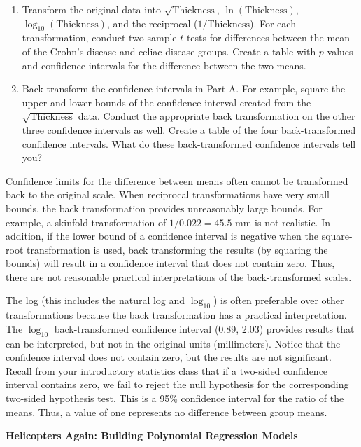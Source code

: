 \documentclass[
]{report}
\begin{document}
\begin{list}{E..}{ \setlength{\itemsep}{1.2em}}
    \begin{enumerate}
      \item Transform the original data into $\sqrt{\text{Thickness}}$, $\ln(\text{Thickness})$, $\log_{10}(\text{Thickness})$, and the reciprocal ($1/\text{Thickness}$). For each transformation, conduct two-sample $t$-tests for differences between the mean of the Crohn’s disease and celiac disease groups. Create a table with $p$-values and confidence intervals for the difference between the two means.
      \item Back transform the confidence intervals in Part A. For example, square the upper and lower bounds of the confidence interval created from the $\sqrt{\text{Thickness}}$ data. Conduct the appropriate back transformation on the other three confidence intervals as well. Create a table of the four back-transformed confidence intervals. What do these back-transformed confidence intervals tell you?
    \end{enumerate}

Confidence limits for the difference between means often cannot be transformed back to the original scale. When reciprocal transformations have very small bounds, the back transformation provides unreasonably large bounds. For example, a skinfold transformation of $1/0.022 = 45.5$ mm is not realistic. In addition, if the lower bound of a confidence interval is negative when the square-root transformation is used, back transforming the results (by squaring the bounds) will result in a confidence interval that does not contain zero. Thus, there are not reasonable practical interpretations of the back-transformed scales.

The log (this includes the natural log and $\log_{10}$) is often preferable over other transformations because the back transformation has a practical interpretation. The $\log_{10}$ back-transformed confidence interval (0.89, 2.03) provides results that can be interpreted, but not in the original units (millimeters). Notice that the confidence interval does not contain zero, but the results are not significant. Recall from your introductory statistics class that if a two-sided confidence interval contains zero, we fail to reject the null hypothesis for the corresponding two-sided hypothesis test. This is a 95\% confidence interval for the ratio of the means. Thus, a value of one represents no difference between group means.

  \item \textbf{Helicopters Again: Building Polynomial Regression Models}


\end{list}
\end{document}
